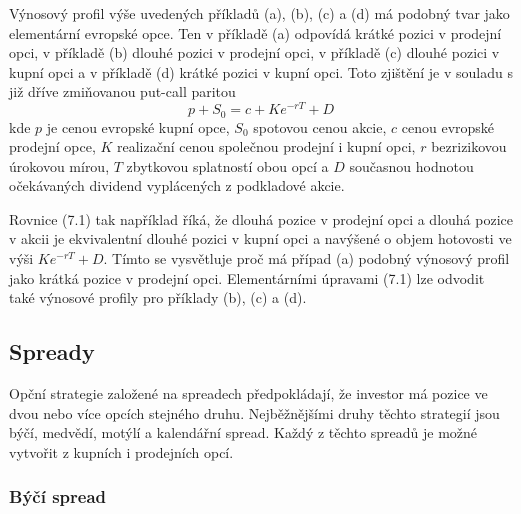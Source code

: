 \documentclass[a4paper]{book}
\begin{document}
Výnosový profil výše uvedených příkladů (a), (b), (c) a (d) má podobný tvar jako elementární evropské opce. Ten v příkladě (a) odpovídá krátké pozici v prodejní opci, v příkladě (b) dlouhé pozici v prodejní opci, v příkladě (c) dlouhé pozici v kupní opci a v příkladě (d) krátké pozici v kupní opci. Toto zjištění je v souladu s již dříve zmiňovanou put-call paritou
\begin{equation}
p + S_0 = c + Ke^{-rT} + D
\end{equation}
kde $p$ je cenou evropské kupní opce, $S_0$ spotovou cenou akcie, $c$ cenou evropské prodejní opce, $K$ realizační cenou společnou prodejní i kupní opci, $r$ bezrizikovou úrokovou mírou, $T$ zbytkovou splatností obou opcí a $D$ současnou hodnotou očekávaných dividend vyplácených z podkladové akcie.

Rovnice (7.1) tak například říká, že dlouhá pozice v prodejní opci a dlouhá pozice v akcii je ekvivalentní dlouhé pozici v kupní opci a navýšené o objem hotovosti ve výši $Ke^{-rT}+D$. Tímto se vysvětluje proč má případ (a) podobný výnosový profil jako krátká pozice v prodejní opci. Elementárními úpravami (7.1) lze odvodit také výnosové profily pro příklady (b), (c) a (d).

\subsection{Spready}

Opční strategie založené na spreadech předpokládají, že investor má pozice ve dvou nebo více opcích stejného druhu. Nejběžnějšími druhy těchto strategií jsou býčí, medvědí, motýlí a kalendářní spread. Každý z těchto spreadů je možné vytvořit z kupních i prodejních opcí.

\subsubsection{Býčí spread}
\end{document}
